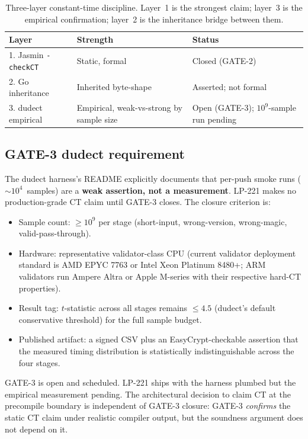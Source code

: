 \begin{table}[h]
\centering
\small
\begin{tabular}{@{}lp{4cm}p{5cm}@{}}
\toprule
\textbf{Layer} & \textbf{Strength} & \textbf{Status} \\
\midrule
1. Jasmin \texttt{-checkCT} & Static, formal & Closed (GATE-2) \\
2. Go inheritance & Inherited byte-shape & Asserted; not formal \\
3. dudect empirical & Empirical, weak-vs-strong by sample size & Open (GATE-3); $10^9$-sample run pending \\
\bottomrule
\end{tabular}
\caption{Three-layer constant-time discipline. Layer~1 is the
strongest claim; layer~3 is the empirical confirmation; layer~2
is the inheritance bridge between them.}
\label{tab:ct-layers}
\end{table}

\subsection{GATE-3 dudect requirement}

The dudect harness's README explicitly documents that per-push
smoke runs ($\sim$$10^4$~samples) are a \textbf{weak assertion, not
a measurement}. LP-221 makes no production-grade CT claim until
GATE-3 closes. The closure criterion is:

\begin{itemize}[leftmargin=2em,nosep]
\item Sample count: $\ge 10^9$ per stage (short-input, wrong-version,
  wrong-magic, valid-pass-through).
\item Hardware: representative validator-class CPU (current
  validator deployment standard is AMD EPYC 7763 or Intel Xeon
  Platinum 8480+; ARM validators run Ampere Altra or Apple M-series
  with their respective hard-CT properties).
\item Result tag: $t$-statistic across all stages remains
  $\le 4.5$ (dudect's default conservative threshold) for the
  full sample budget.
\item Published artifact: a signed CSV plus an EasyCrypt-checkable
  assertion that the measured timing distribution is statistically
  indistinguishable across the four stages.
\end{itemize}

GATE-3 is open and scheduled. LP-221 ships with the harness
plumbed but the empirical measurement pending. The architectural
decision to claim CT at the precompile boundary is independent of
GATE-3 closure: GATE-3 \emph{confirms} the static CT claim under
realistic compiler output, but the soundness argument does not
depend on it.

